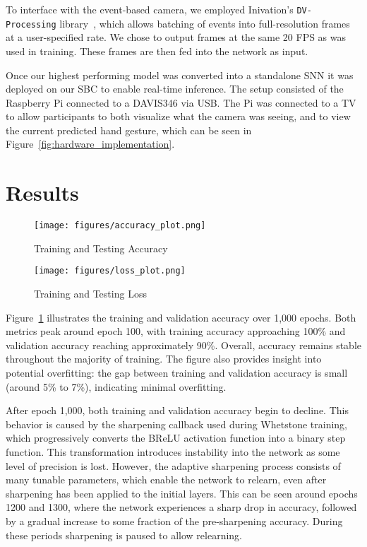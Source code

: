\documentclass[conference]{IEEEtran}
\begin{document}
To interface with the event-based camera, we employed Inivation’s \texttt{DV-Processing} library~\cite{dv-processing}, which allows batching of events into full-resolution frames at a user-specified rate. We chose to output frames at the same 20 FPS as was used in training. These frames are then fed into the network as input.

Once our highest performing model was converted into a standalone SNN it was deployed on our SBC to enable real-time inference. The setup consisted of the Raspberry Pi connected to a DAVIS346 via USB. The Pi was connected to a TV to allow participants to both visualize what the camera was seeing, and to view the current predicted hand gesture, which can be seen in Figure~\ref{fig:hardware_implementation}.

\section{Results}
\label{sec:results}

\begin{figure}[!ht]
    \texttt{[image: figures/accuracy\_plot.png]}
    \caption{Training and Testing Accuracy}
    \label{fig:accuracy_plot}
\end{figure}

\begin{figure}[!ht]
    \texttt{[image: figures/loss\_plot.png]}
    \caption{Training and Testing Loss}
    \label{fig:loss_plot}
\end{figure}

Figure~\ref{fig:accuracy_plot} illustrates the training and validation accuracy over 1,000 epochs. Both metrics peak around epoch 100, with training accuracy approaching 100\% and validation accuracy reaching approximately 90\%. Overall, accuracy remains stable throughout the majority of training. The figure also provides insight into potential overfitting: the gap between training and validation accuracy is small (around 5\% to 7\%), indicating minimal overfitting.

After epoch 1,000, both training and validation accuracy begin to decline. This behavior is caused by the sharpening callback used during Whetstone training, which progressively converts the BReLU activation function into a binary step function. This transformation introduces instability into the network as some level of precision is lost. However, the adaptive sharpening process consists of many tunable parameters, which enable the network to relearn, even after sharpening has been applied to the initial layers. This can be seen around epochs 1200 and 1300, where the network experiences a sharp drop in accuracy, followed by a gradual increase to some fraction of the pre-sharpening accuracy. During these periods sharpening is paused to allow relearning.
\end{document}
